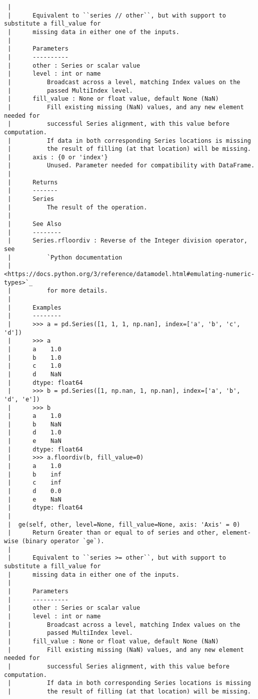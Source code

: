 \documentclass[
  letterpaper,
  DIV=11,
  numbers=noendperiod]{scrreprt}
\begin{document}
\begin{verbatim}
 |      
 |      Equivalent to ``series // other``, but with support to substitute a fill_value for
 |      missing data in either one of the inputs.
 |      
 |      Parameters
 |      ----------
 |      other : Series or scalar value
 |      level : int or name
 |          Broadcast across a level, matching Index values on the
 |          passed MultiIndex level.
 |      fill_value : None or float value, default None (NaN)
 |          Fill existing missing (NaN) values, and any new element needed for
 |          successful Series alignment, with this value before computation.
 |          If data in both corresponding Series locations is missing
 |          the result of filling (at that location) will be missing.
 |      axis : {0 or 'index'}
 |          Unused. Parameter needed for compatibility with DataFrame.
 |      
 |      Returns
 |      -------
 |      Series
 |          The result of the operation.
 |      
 |      See Also
 |      --------
 |      Series.rfloordiv : Reverse of the Integer division operator, see
 |          `Python documentation
 |          <https://docs.python.org/3/reference/datamodel.html#emulating-numeric-types>`_
 |          for more details.
 |      
 |      Examples
 |      --------
 |      >>> a = pd.Series([1, 1, 1, np.nan], index=['a', 'b', 'c', 'd'])
 |      >>> a
 |      a    1.0
 |      b    1.0
 |      c    1.0
 |      d    NaN
 |      dtype: float64
 |      >>> b = pd.Series([1, np.nan, 1, np.nan], index=['a', 'b', 'd', 'e'])
 |      >>> b
 |      a    1.0
 |      b    NaN
 |      d    1.0
 |      e    NaN
 |      dtype: float64
 |      >>> a.floordiv(b, fill_value=0)
 |      a    1.0
 |      b    inf
 |      c    inf
 |      d    0.0
 |      e    NaN
 |      dtype: float64
 |  
 |  ge(self, other, level=None, fill_value=None, axis: 'Axis' = 0)
 |      Return Greater than or equal to of series and other, element-wise (binary operator `ge`).
 |      
 |      Equivalent to ``series >= other``, but with support to substitute a fill_value for
 |      missing data in either one of the inputs.
 |      
 |      Parameters
 |      ----------
 |      other : Series or scalar value
 |      level : int or name
 |          Broadcast across a level, matching Index values on the
 |          passed MultiIndex level.
 |      fill_value : None or float value, default None (NaN)
 |          Fill existing missing (NaN) values, and any new element needed for
 |          successful Series alignment, with this value before computation.
 |          If data in both corresponding Series locations is missing
 |          the result of filling (at that location) will be missing.

\end{verbatim}
\end{document}
